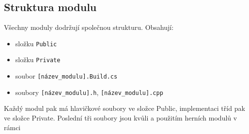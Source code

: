 \subsection{Struktura modulu}
Všechny moduly dodržují společnou strukturu. Obsahují:
\begin{itemize}
	\item složku \verb!Public!
	\item složku \verb!Private!
	\item soubor \verb![název_modulu].Build.cs!
	\item soubory \verb![název_modulu].h!, \verb![název_modulu].cpp!
\end{itemize}


Každý modul pak má hlavičkové soubory ve složce Public, implementaci tříd pak ve složce Private. Poslední tři soubory jsou kvůli \UBT{} a použitím herních modulů v rámci \UE{}












